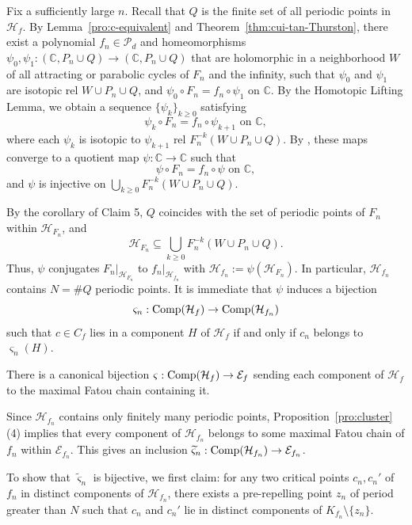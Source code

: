 \documentclass[a4paper,reqno,times, 11pt]{amsart}
\theoremstyle{remark}
\theoremstyle{plain}
\numberwithin{equation}{section}
\def\HHH{{\cal H}}
\def\PPPP{\mathscr P}
\def\cal{\mathcal}
\begin{document}
Fix a sufficiently large $n$. Recall that $Q$ is the finite set of all  periodic points in $\HHH_f$. By Lemma~\ref{pro:c-equivalent} and Theorem~\ref{thm:cui-tan-Thurston}, there exist a polynomial $f_n \in \PPPP_d$ and homeomorphisms $\psi_0, \psi_1: (\mathbb{C}, P_n \cup Q) \to (\mathbb{C}, P_n \cup Q)$ that are holomorphic in a neighborhood $W$ of all attracting or parabolic cycles of $F_n$ and the infinity, such that $\psi_0$ and $\psi_1$ are isotopic rel $W \cup P_n \cup Q$, and  $\psi_0 \circ F_n = f_n \circ \psi_1$ on $\mathbb{C}$.
		By the Homotopic Lifting Lemma, we obtain a sequence $\{\psi_k\}_{k \geq 0}$ satisfying
		\[
		\psi_k \circ F_n = f_n \circ \psi_{k+1} \text{ on } \mathbb{C},
		\]
		where each $\psi_k$ is isotopic to $\psi_{k+1}$ rel $F_n^{-k}(W \cup P_n \cup Q)$. By \cite[Lemma 2.2]{CPT}, these maps converge to a quotient map $\psi: \mathbb{C} \to \mathbb{C}$ such that
		\[
		\psi \circ F_n = f_n \circ \psi  \text{ on } \mathbb{C},
		\]
		and $\psi$ is injective on $\bigcup_{k \geq 0} F_n^{-k}(W \cup P_n \cup Q)$.
		
		By the corollary of Claim 5,  $Q$ coincides with the set of periodic points of $F_n$ within $\HHH_{F_n}$, and $$\mathcal{H}_{F_n} \subseteq \bigcup_{k\geq 0} F_n^{-k}(W \cup P_n \cup Q).$$
		Thus, $\psi$ conjugates $F_n|_{\mathcal{H}_{F_n}}$ to $f_n|_{\mathcal{H}_{f_n}}$ with $\mathcal{H}_{f_n} := \psi(\mathcal{H}_{F_n})$.
		In particular, $\mathcal{H}_{f_n}$ contains $N=\# Q$ periodic points. It is immediate that $\psi$ induces a bijection
		$$\varsigma_n: \textup{Comp}(\mathcal{H}_{f}) \to \textup{Comp}(\mathcal{H}_{f_n})$$ such that $c\in C_f$ lies in a component $H $ of $\HHH_f$ if and only if $c_n$ belongs to $\varsigma_n(H)$.
		
		There is a canonical bijection \(\varsigma: \textup{Comp}(\mathcal{H}_f) \to \mathcal{E}_f\) sending each component of \(\mathcal{H}_f\) to the maximal Fatou chain containing it.
		
		Since \(\mathcal{H}_{f_n}\) contains only finitely many periodic points, Proposition~\ref{pro:cluster}\,(4) implies that every component of \(\mathcal{H}_{f_n}\) belongs to some maximal Fatou chain of \(f_n\) within $\mathcal{E}_{f_n}$. This gives an inclusion \(\widetilde{\varsigma}_n: \textup{Comp}(\mathcal{H}_{f_n}) \to \mathcal{E}_{f_n}\).
		
		To show that \(\widetilde{\varsigma}_n\) is bijective, we first claim: for any two critical points \(c_n, c_n'\) of \(f_n\) in distinct components of \(\mathcal{H}_{f_n}\), there exists a pre-repelling point \(z_n\) of period greater than \(N\) such that \(c_n\) and \(c_n'\) lie in distinct components of \(K_{f_n}\setminus\{z_n\}\).
		
\end{document}
